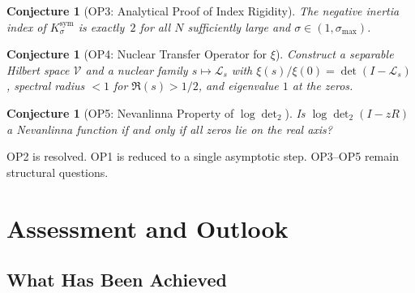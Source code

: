 \documentclass[12pt,a4paper]{article}
\newtheorem{conjecture}[theorem]{Conjecture}
\theoremstyle{definition}
\theoremstyle{remark}
\begin{document}
\begin{conjecture}[OP3: Analytical Proof of Index Rigidity]
The negative inertia index of $K_\sigma^{\mathrm{sym}}$ is exactly~$2$
for all $N$ sufficiently large and
$\sigma \in (1, \sigma_{\max})$.
\end{conjecture}

\begin{conjecture}[OP4: Nuclear Transfer Operator for $\xi$]
Construct a separable Hilbert space $\mathcal{V}$ and a nuclear family
$s \mapsto \mathcal{L}_s$ with
$\xi(s)/\xi(0) = \det(I - \mathcal{L}_s)$, spectral radius $< 1$ for
$\Re(s) > 1/2$, and eigenvalue $1$ at the zeros.
\end{conjecture}

\begin{conjecture}[OP5: Nevanlinna Property of $\log\det_2$]
Is $\log\det_2(I - zR)$ a Nevanlinna function if and only if all zeros
lie on the real axis?
\end{conjecture}

\noindent OP2 is resolved. OP1 is reduced to a single asymptotic step.
OP3--OP5 remain structural questions.


\section{Assessment and Outlook}
\label{sec:outlook}

\subsection{What Has Been Achieved}
\end{document}
